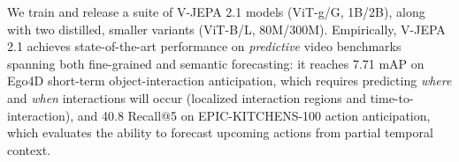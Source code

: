 \documentclass[]{fairmeta}
\begin{document}

We train and release a suite of V-JEPA 2.1 models (ViT-g/G, 1B/2B), along with two distilled, smaller variants (ViT-B/L, 80M/300M). Empirically, V-JEPA 2.1 achieves state-of-the-art performance on \emph{predictive} video benchmarks spanning both fine-grained and semantic forecasting: it reaches 7.71 mAP on Ego4D short-term object-interaction anticipation, which requires predicting \emph{where} and \emph{when} interactions will occur (localized interaction regions and time-to-interaction), and 40.8 Recall@5 on EPIC-KITCHENS-100 action anticipation, which evaluates the ability to forecast upcoming actions from partial temporal context. 
\end{document}
